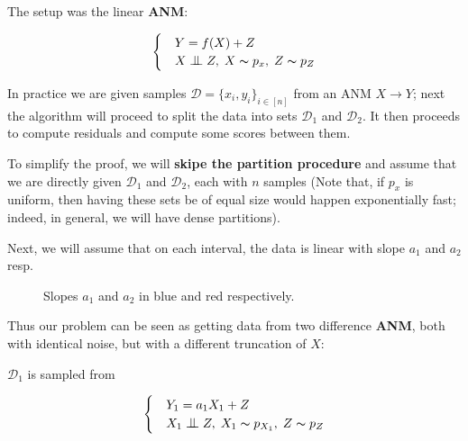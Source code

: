 The setup was the linear \textbf{ANM}:

\[ \begin{cases} 
    & Y = f(X) + Z  \\
    & X \bigCI Z,\; X \thicksim p_x,\; Z \thicksim p_{Z}  
 \end{cases}
\]

In practice we are given samples $\mathcal{D} = \{x_i, y_i\}_{i \in [n]}$ from an ANM $X \rightarrow Y$; next 
the algorithm will proceed to split the data into sets $\mathcal{D}_1$ and $\mathcal{D}_2$. It then proceeds 
to compute residuals and compute some scores between them.

To simplify the proof, we will \textbf{skipe the partition procedure} and assume that
we are directly given $\mathcal{D}_1$ and $\mathcal{D}_2$, each with 
$n$ samples (Note that, if $p_x$ is uniform, then having these sets be of equal size would happen exponentially 
fast; indeed, in general, we will have dense partitions). 

Next, we will assume that on each interval, the data is linear with slope $a_1$ and $a_2$ resp. 

\begin{figure}[!h]
    \centering
      \caption{Slopes $a_1$ and $a_2$ in blue and red respectively.}
\end{figure}

Thus our problem can be seen as getting data from two difference \textbf{ANM}, both with identical noise, but with 
a different truncation of $X$:

$\mathcal{D}_1$ is sampled from 

\[ \begin{cases} 
    & Y_1 = a_1 X_1 + Z  \\
    & X_1 \bigCI Z,\; X_1 \thicksim p_{X_1},\; Z \thicksim p_{Z}  
 \end{cases}
\]

